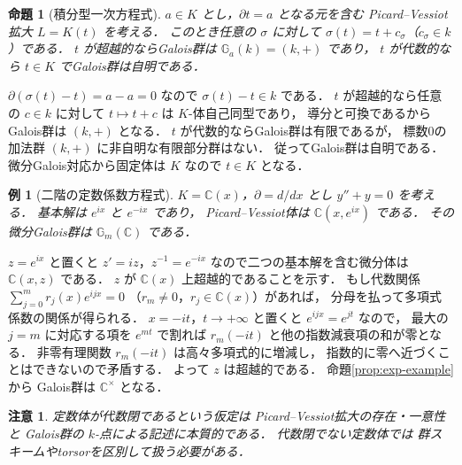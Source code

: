 \documentclass[a5paper,10pt,onecolumn]{jsarticle}
\makeatletter
\theoremstyle{mathnotetheorem}
\newtheorem{proposition}[theorem]{命題}
\newtheorem{example}[theorem]{例}
\newtheorem{remark}[theorem]{注意}
\renewcommand{\proofname}{証明}
\renewenvironment{proof}[1][\proofname]{%
  \par\pushQED{\qed}\normalfont\topsep4\p@\@plus2\p@\relax
  \trivlist\item[\hskip\labelsep\bfseries #1]\ignorespaces
}{\popQED\endtrivlist\@endpefalse}
\makeatother
\begin{document}
\begin{proposition}[積分型一次方程式]
\label{prop:int-example}
$a\in K$ とし，$\partial t=a$ となる元を含む
Picard--Vessiot拡大 $L=K(t)$ を考える．
このとき任意の $\sigma$ に対して
$\sigma(t)=t+c_\sigma$（$c_\sigma\in k$）である．
$t$ が超越的ならGalois群は
$\mathbb G_a(k)=(k,+)$ であり，
$t$ が代数的なら $t\in K$ でGalois群は自明である．
\end{proposition}
\begin{proof}
$\partial(\sigma(t)-t)=a-a=0$ なので
$\sigma(t)-t\in k$ である．
$t$ が超越的なら任意の $c\in k$ に対して
$t\mapsto t+c$ は $K$-体自己同型であり，
導分と可換であるからGalois群は $(k,+)$ となる．
$t$ が代数的ならGalois群は有限であるが，
標数0の加法群 $(k,+)$ に非自明な有限部分群はない．
従ってGalois群は自明である．
微分Galois対応から固定体は $K$ なので $t\in K$ となる．
\end{proof}

\begin{example}[二階の定数係数方程式]
$K=\mathbb C(x)$，$\partial=d/dx$ とし
$y''+y=0$ を考える．
基本解は $e^{ix}$ と $e^{-ix}$ であり，
Picard--Vessiot体は $\mathbb C(x,e^{ix})$ である．
その微分Galois群は $\mathbb G_m(\mathbb C)$ である．
\end{example}
\begin{proof}
$z=e^{ix}$ と置くと $z'=iz$，$z^{-1}=e^{-ix}$
なので二つの基本解を含む微分体は
$\mathbb C(x,z)$ である．
$z$ が $\mathbb C(x)$ 上超越的であることを示す．
もし代数関係
$\sum_{j=0}^mr_j(x)e^{ijx}=0$
（$r_m\ne0$，$r_j\in\mathbb C(x)$）があれば，
分母を払って多項式係数の関係が得られる．
$x=-it$，$t\to+\infty$ と置くと
$e^{ijx}=e^{jt}$ なので，
最大の $j=m$ に対応する項を $e^{mt}$ で割れば
$r_m(-it)$ と他の指数減衰項の和が零となる．
非零有理関数 $r_m(-it)$ は高々多項式的に増減し，
指数的に零へ近づくことはできないので矛盾する．
よって $z$ は超越的である．
命題\ref{prop:exp-example}から
Galois群は $\mathbb C^\times$ となる．
\end{proof}

\begin{remark}
定数体が代数閉であるという仮定は
Picard--Vessiot拡大の存在・一意性と
Galois群の $k$-点による記述に本質的である．
代数閉でない定数体では
群スキームやtorsorを区別して扱う必要がある．
\end{remark}
\end{document}

